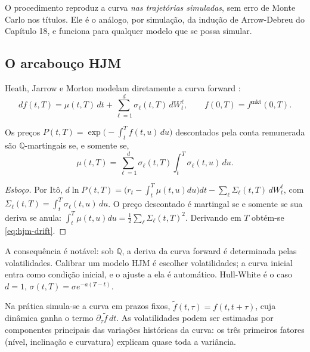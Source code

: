 O procedimento reproduz a curva \emph{nas trajetórias simuladas}, sem erro de Monte Carlo nos títulos. Ele é o análogo, por simulação, da indução de Arrow-Debreu do Capítulo 18, e funciona para qualquer modelo que se possa simular.

\subsection{O arcabouço HJM}

\begin{definicao}
Heath, Jarrow e Morton modelam diretamente a curva forward \citep{hjm1992}:
\begin{equation}
df(t,T)=\mu(t,T)\,dt+\sum_{\ell=1}^d\sigma_\ell(t,T)\,dW^\ell_t,\qquad f(0,T)=f^{\mathrm{mkt}}(0,T).
\end{equation}
\end{definicao}

\begin{teorema}\label{teo:hjm}
Os preços $P(t,T)=\exp\big(-\int_t^Tf(t,u)\,du\big)$ descontados pela conta remunerada são $\mathbb Q$-martingais se, e somente se,
\begin{equation}\label{eq:hjm-drift}
\mu(t,T)=\sum_{\ell=1}^d\sigma_\ell(t,T)\int_t^T\sigma_\ell(t,u)\,du.
\end{equation}
\end{teorema}

\begin{proof}[Esboço]
Por Itô, $d\ln P(t,T)=\big(r_t-\int_t^T\mu(t,u)du\big)dt-\sum_\ell\Sigma_\ell(t,T)\,dW^\ell_t$, com $\Sigma_\ell(t,T)=\int_t^T\sigma_\ell(t,u)\,du$. O preço descontado é martingal se e somente se sua deriva se anula: $\int_t^T\mu(t,u)du=\tfrac12\sum_\ell\Sigma_\ell(t,T)^2$. Derivando em $T$ obtém-se \eqref{eq:hjm-drift}.
\end{proof}

A consequência é notável: sob $\mathbb Q$, a deriva da curva forward é determinada pelas volatilidades. Calibrar um modelo HJM é escolher volatilidades; a curva inicial entra como condição inicial, e o ajuste a ela é automático. Hull-White é o caso $d=1$, $\sigma(t,T)=\sigma e^{-a(T-t)}$.

\begin{observacao}
Na prática simula-se a curva em prazos fixos, $\tilde f(t,\tau)=f(t,t+\tau)$, cuja dinâmica ganha o termo $\partial_\tau\tilde f\,dt$. As volatilidades podem ser estimadas por componentes principais das variações históricas da curva: os três primeiros fatores (nível, inclinação e curvatura) explicam quase toda a variância.
\end{observacao}

